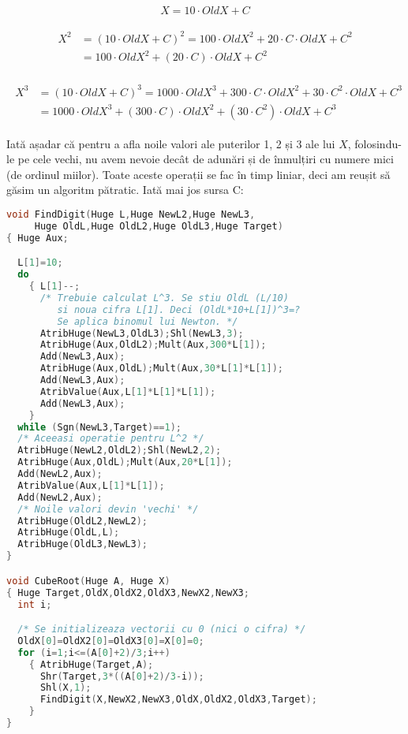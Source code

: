 \begin{equation}
  X = 10 \cdot OldX + C
\end{equation}

\begin{align}
  \begin{split}
    X^2 & = (10 \cdot OldX + C)^2 = 100 \cdot OldX^2 + 20 \cdot C \cdot OldX + C^2 \\
    & = 100 \cdot OldX^2 + (20 \cdot C) \cdot OldX + C^2
  \end{split}
\end{align}

\begin{align}
  \begin{split}
    X^3 & = (10 \cdot OldX + C)^3 = 1000 \cdot OldX^3 + 300 \cdot C \cdot OldX^2 + 30 \cdot C^2 \cdot OldX + C^3 \\
    & = 1000 \cdot OldX^3 + (300 \cdot C) \cdot OldX^2 + (30 \cdot C^2) \cdot OldX + C^3
  \end{split}
\end{align}

Iată așadar că pentru a afla noile valori ale puterilor 1, 2 și 3 ale lui $X$,
folosindu-le pe cele vechi, nu avem nevoie decât de adunări și de înmulțiri cu
numere mici (de ordinul miilor). Toate aceste operații se fac în timp liniar,
deci am reușit să găsim un algoritm pătratic. Iată mai jos sursa C:

\begin{lstlisting}[language=C]
void FindDigit(Huge L,Huge NewL2,Huge NewL3,
     Huge OldL,Huge OldL2,Huge OldL3,Huge Target)
{ Huge Aux;

  L[1]=10;
  do
    { L[1]--;
      /* Trebuie calculat L^3. Se stiu OldL (L/10)
         si noua cifra L[1]. Deci (OldL*10+L[1])^3=?
         Se aplica binomul lui Newton. */
      AtribHuge(NewL3,OldL3);Shl(NewL3,3);
      AtribHuge(Aux,OldL2);Mult(Aux,300*L[1]);
      Add(NewL3,Aux);
      AtribHuge(Aux,OldL);Mult(Aux,30*L[1]*L[1]);
      Add(NewL3,Aux);
      AtribValue(Aux,L[1]*L[1]*L[1]);
      Add(NewL3,Aux);
    }
  while (Sgn(NewL3,Target)==1);
  /* Aceeasi operatie pentru L^2 */
  AtribHuge(NewL2,OldL2);Shl(NewL2,2);
  AtribHuge(Aux,OldL);Mult(Aux,20*L[1]);
  Add(NewL2,Aux);
  AtribValue(Aux,L[1]*L[1]);
  Add(NewL2,Aux);
  /* Noile valori devin 'vechi' */
  AtribHuge(OldL2,NewL2);
  AtribHuge(OldL,L);
  AtribHuge(OldL3,NewL3);
}

void CubeRoot(Huge A, Huge X)
{ Huge Target,OldX,OldX2,OldX3,NewX2,NewX3;
  int i;

  /* Se initializeaza vectorii cu 0 (nici o cifra) */
  OldX[0]=OldX2[0]=OldX3[0]=X[0]=0;
  for (i=1;i<=(A[0]+2)/3;i++)
    { AtribHuge(Target,A);
      Shr(Target,3*((A[0]+2)/3-i));
      Shl(X,1);
      FindDigit(X,NewX2,NewX3,OldX,OldX2,OldX3,Target);
    }
}
\end{lstlisting}

